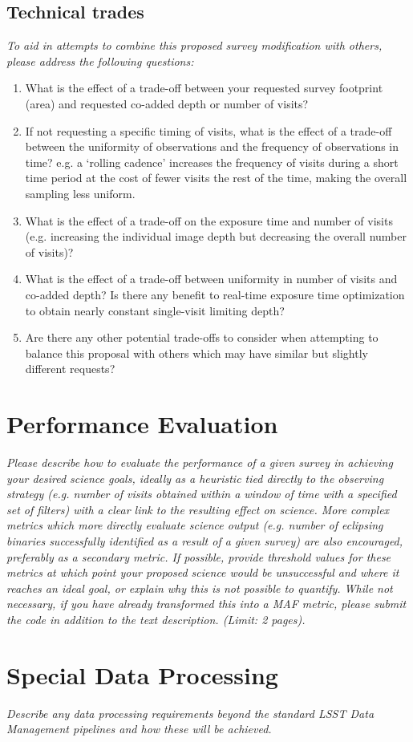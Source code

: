 \documentclass[11pt]{article}
\begin{document}
\subsection{Technical trades}
\begin{footnotesize}
{\it To aid in attempts to combine this proposed survey modification with others, please address the following questions:
\begin{enumerate}
    \item What is the effect of a trade-off between your requested survey footprint (area) and requested co-added depth or number of visits?
    \item If not requesting a specific timing of visits, what is the effect of a trade-off between the uniformity of observations and the frequency of observations in time? e.g. a `rolling cadence' increases the frequency of visits during a short time period at the cost of fewer visits the rest of the time, making the overall sampling less uniform.
    \item What is the effect of a trade-off on the exposure time and number of visits (e.g. increasing the individual image depth but decreasing the overall number of visits)?
    \item What is the effect of a trade-off between uniformity in number of visits and co-added depth? Is there any benefit to real-time exposure time optimization to obtain nearly constant single-visit limiting depth?
    \item Are there any other potential trade-offs to consider when attempting to balance this proposal with others which may have similar but slightly different requests?
\end{enumerate}}
\end{footnotesize}

\section{Performance Evaluation}
\begin{footnotesize}
{\it Please describe how to evaluate the performance of a given survey in achieving your desired
science goals, ideally as a heuristic tied directly to the observing strategy (e.g. number of visits obtained
within a window of time with a specified set of filters) with a clear link to the resulting effect on science.
More complex metrics which more directly evaluate science output (e.g. number of eclipsing binaries successfully
identified as a result of a given survey) are also encouraged, preferably as a secondary metric.
If possible, provide threshold values for these metrics at which point your proposed science would be unsuccessful 
and where it reaches an ideal goal, or explain why this is not possible to quantify. While not necessary, 
if you have already transformed this into a MAF metric, please submit the code in addition to the text description. (Limit: 2 pages).}
\end{footnotesize}

\vspace{.6in}

\section{Special Data Processing}
\begin{footnotesize}
{\it Describe any data processing requirements beyond the standard LSST Data Management pipelines and how these will be achieved.}
\end{footnotesize}
\end{document}
